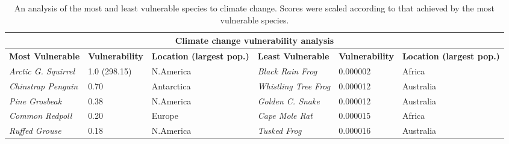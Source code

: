 \begin{table}[hbt!]
\begin{tabular}{ |p{2cm}|p{2cm}|p{2cm}||p{2cm}|p{2cm}|p{2cm}|  }
 \hline
 \multicolumn{6}{|c|}{\textbf{Climate change vulnerability analysis}} \\
 \hline
 \rowcolor{lightgray} \footnotesize{\textbf{Most Vulnerable}}& \footnotesize{\textbf{Vulnerability}} & \footnotesize{\textbf{Location (largest pop.)}} & \footnotesize{\textbf{Least Vulnerable}} & \footnotesize{\textbf{Vulnerability}} & \footnotesize{\textbf{Location (largest pop.)}} \\
 \hline
\scriptsize{\emph{Arctic G. Squirrel}}  & \scriptsize{1.0 (298.15)} & \scriptsize{N.America} & \scriptsize{\emph{Black Rain Frog}} & \scriptsize{0.000002} & \scriptsize{Africa} \\
\scriptsize{\emph{Chinstrap Penguin}} & \scriptsize{0.70}  & \scriptsize{Antarctica} & \scriptsize{\emph{Whistling Tree Frog}} & \scriptsize{0.000012} & \scriptsize{Australia} \\
\scriptsize{\emph{Pine Grosbeak}} & \scriptsize{0.38} & \scriptsize{N.America} & \scriptsize{\emph{Golden C. Snake}} & \scriptsize{0.000012} & \scriptsize{Australia} \\
\scriptsize{\emph{Common Redpoll}} & \scriptsize{0.20} & \scriptsize{Europe}  & \scriptsize{\emph{Cape Mole Rat}} & \scriptsize{0.000015} & \scriptsize{Africa} \\
\scriptsize{\emph{Ruffed Grouse}} &  \scriptsize{0.18}  & \scriptsize{N.America} & \scriptsize{\emph{Tusked Frog}} & \scriptsize{0.000016} & \scriptsize{Australia} \\

 \hline
\end{tabular}
\caption{An analysis of the most and least vulnerable species to climate change. Scores were scaled according to that achieved by the most vulnerable species.}
\label{tab:vulnerability}
\end{table}
\vspace{-3ex}

